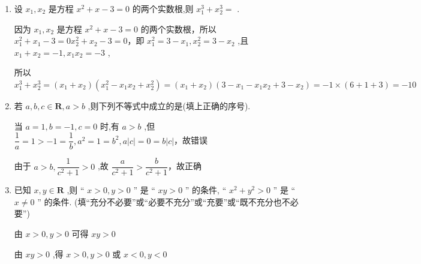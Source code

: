 \begin{enumerate}
\begin{jieda}
        $\left| {{x}_{1} - {x}_{2}}\right|  = \sqrt{13}$
    \end{jieda}
    \item 设 ${x}_{1},{x}_{2}$ 是方程 ${x}^{2} + x - 3 = 0$ 的两个实数根,则 ${x}_{1}^{3} + {x}_{2}^{3} =$ .
    \begin{jieda}
        因为 ${x}_{1},{x}_{2}$ 是方程 ${x}^{2} + x - 3 = 0$ 的两个实数根，所以 ${x}_{1}^{2} + {x}_{1} - 3 = 0{x}_{2}^{2} + {x}_{2} - 3 = 0$，即 ${x}_{1}^{2} = 3 - {x}_{1},{x}_{2}^{2} = 3 - {x}_{2}$ ,且 ${x}_{1} + {x}_{2} =  - 1,{x}_{1}{x}_{2} =  - 3$ ,
        
        所以 ${x}_{1}^{3} + {x}_{2}^{3} = \left( {{x}_{1} + {x}_{2}}\right) \left( {{x}_{1}^{2} - {x}_{1}{x}_{2} + {x}_{2}^{2}}\right)  = \left( {{x}_{1} + {x}_{2}}\right) \left( {3 - {x}_{1} - {x}_{1}{x}_{2} + 3 - {x}_{2}}\right) =  - 1 \times  \left( {6 + 1 + 3}\right)  =  - {10}$
    \end{jieda}
    \item 若 $a,b,c \in  \mathbf{R},a > b$ ,则下列不等式中成立的是(填上正确的序号).
    \begin{jieda}
        当 $a = 1,b =  - 1,c = 0$ 时,有 $a > b$ ,但 $\dfrac{1}{a} = 1 >  - 1 = \dfrac{1}{b},{a}^{2} = 1 = {b}^{2},a\left| c\right|  = 0 = b\left| c\right|$，故错误

        由于 $a > b,\dfrac{1}{{c}^{2} + 1} > 0$ ,故 $\dfrac{a}{{c}^{2} + 1} > \dfrac{b}{{c}^{2} + 1}$，故正确
    \end{jieda}
    \item 已知 $x,y \in  \mathbf{R}$ ,则 “ $x > 0,y > 0$ ” 是 “ ${xy} > 0$ ” 的条件, “ ${x}^{2} + {y}^{2} > 0$ ” 是 “ $x \neq  0$ ” 的条件. (填“充分不必要”或“必要不充分”或“充要”或“既不充分也不必要”)
    \begin{jieda}
        由 $x > 0,y > 0$ 可得 ${xy} > 0$
        
        由 ${xy} > 0$ ,得 $x > 0,y > 0$ 或 $x < 0,y < 0$ 
        

\end{jieda}
\end{enumerate}

